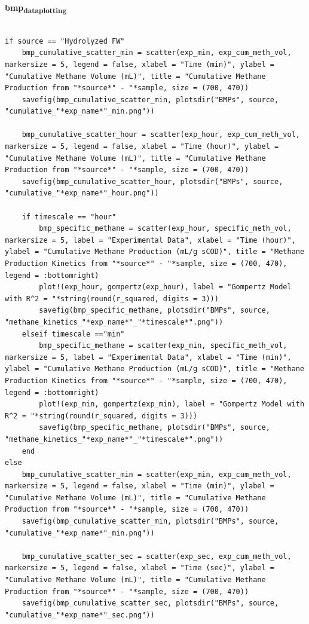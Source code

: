 \documentclass[11pt]{article}
\begin{document}
\textbf{bmp\textsubscript{data}\textsubscript{plotting}}
\begin{verbatim}

if source == "Hydrolyzed FW"
    bmp_cumulative_scatter_min = scatter(exp_min, exp_cum_meth_vol, markersize = 5, legend = false, xlabel = "Time (min)", ylabel = "Cumulative Methane Volume (mL)", title = "Cumulative Methane Production from "*source*" - "*sample, size = (700, 470))
    savefig(bmp_cumulative_scatter_min, plotsdir("BMPs", source, "cumulative_"*exp_name*"_min.png"))

    bmp_cumulative_scatter_hour = scatter(exp_hour, exp_cum_meth_vol, markersize = 5, legend = false, xlabel = "Time (hour)", ylabel = "Cumulative Methane Volume (mL)", title = "Cumulative Methane Production from "*source*" - "*sample, size = (700, 470))
    savefig(bmp_cumulative_scatter_hour, plotsdir("BMPs", source, "cumulative_"*exp_name*"_hour.png"))

    if timescale == "hour"
        bmp_specific_methane = scatter(exp_hour, specific_meth_vol, markersize = 5, label = "Experimental Data", xlabel = "Time (hour)", ylabel = "Cumulative Methane Production (mL/g sCOD)", title = "Methane Production Kinetics from "*source*" - "*sample, size = (700, 470), legend = :bottomright)
        plot!(exp_hour, gompertz(exp_hour), label = "Gompertz Model with R^2 = "*string(round(r_squared, digits = 3)))
        savefig(bmp_specific_methane, plotsdir("BMPs", source, "methane_kinetics_"*exp_name*"_"*timescale*".png"))
    elseif timescale =="min" 
        bmp_specific_methane = scatter(exp_min, specific_meth_vol, markersize = 5, label = "Experimental Data", xlabel = "Time (min)", ylabel = "Cumulative Methane Production (mL/g sCOD)", title = "Methane Production Kinetics from "*source*" - "*sample, size = (700, 470), legend = :bottomright)
        plot!(exp_min, gompertz(exp_min), label = "Gompertz Model with R^2 = "*string(round(r_squared, digits = 3)))
        savefig(bmp_specific_methane, plotsdir("BMPs", source, "methane_kinetics_"*exp_name*"_"*timescale*".png"))
    end
else
    bmp_cumulative_scatter_min = scatter(exp_min, exp_cum_meth_vol, markersize = 5, legend = false, xlabel = "Time (min)", ylabel = "Cumulative Methane Volume (mL)", title = "Cumulative Methane Production from "*source*" - "*sample, size = (700, 470))
    savefig(bmp_cumulative_scatter_min, plotsdir("BMPs", source, "cumulative_"*exp_name*"_min.png"))

    bmp_cumulative_scatter_sec = scatter(exp_sec, exp_cum_meth_vol, markersize = 5, legend = false, xlabel = "Time (sec)", ylabel = "Cumulative Methane Volume (mL)", title = "Cumulative Methane Production from "*source*" - "*sample, size = (700, 470))
    savefig(bmp_cumulative_scatter_sec, plotsdir("BMPs", source, "cumulative_"*exp_name*"_sec.png"))


\end{verbatim}
\end{document}
